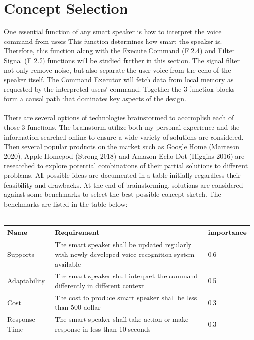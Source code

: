 \documentclass{article}
\begin{document}
\section{Concept Selection}
One essential function of any smart speaker is how to interpret the voice command from users This function determines how smart the speaker is. Therefore, this function along with the Execute Command (F 2.4) and Filter Signal (F 2.2) functions will be studied further in this section. The signal filter not only remove noise, but also separate the user voice from the echo of the speaker itself. The Command Executor will fetch data from local memory as requested by the interpreted users' command. Together the 3 function blocks form a causal path that dominates key aspects of the design.\\\\
There are several options of technologies brainstormed to accomplish each of those 3 functions. The brainstorm utilize both my personal experience and the information searched online to ensure a wide variety of solutions are considered. Then several popular products on the market such as Google Home (Marteson 2020), Apple Homepod  (Strong 2018) and Amazon Echo Dot (Higgins 2016) are researched to explore potential combinations of their partial solutions to different problems. All possible ideas are documented in a table initially regardless their feasibility and drawbacks. At the end of brainstorming, solutions are considered against some benchmarks to select the best possible concept sketch. The benchmarks are listed in the table below:\\\\
\begin{center}
\begin{longtable}{| m{} | m{} | m{} |} 
 \hline
 Name & Requirement & importance \\ 
 \hline\hline
 Supports & The smart speaker shall be updated regularly with newly developed voice recognition system available & 0.6\\ 
 \hline
 Adaptability & The smart speaker shall interpret the command differently in different context & 0.5\\ 
 \hline
 Cost & The cost to produce smart speaker shall be less than 500 dollar & 0.3\\ 
 \hline
 Response Time & The smart speaker shall take action or make response in less than 10 seconds & 0.3\\ 
 \hline
\end{longtable}
\end{center}
\end{document}
